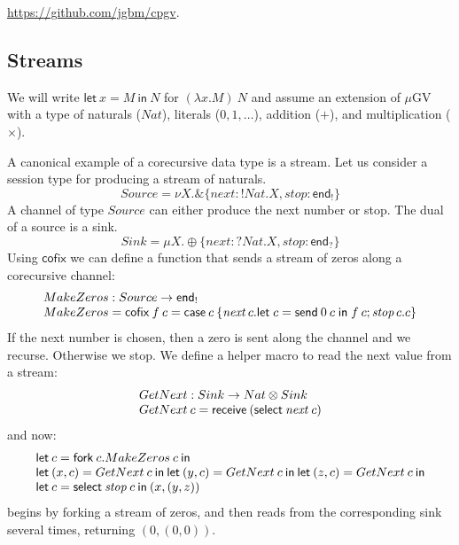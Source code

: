 \documentclass[orivec,envcountsame]{llncs}
\makeatletter
\newcommand{\with}{\mathbin\binampersand}
\newcommand{\gvout}[2]{{!#1.#2}}
\newcommand{\gvin}[2]{{?#1.#2}}
\newcommand{\lto}{\ensuremath{\multimap}}
\newcommand{\uto}{\ensuremath{\rightarrow}}
\newcommand{\outterm}{\mkwd{end}_!}
\newcommand{\interm}{\mkwd{end}_?}
\newcommand{\mkwd}[1]{\mathsf{#1}}
\newcommand{\clabel}[1]{\mathit{#1}}
\newcommand{\gvsend}[2]{\mkwd{send}\:#1\:#2}
\newcommand{\gvreceive}[1]{\mkwd{receive}\:#1}
\newcommand{\gvlet}[3]{\mkwd{let}\;#1 = #2\;\mkwd{in}\;#3}
\newcommand{\gvselect}[2]{\mkwd{select}\:#1\:#2}
\newcommand{\gvcase}[2]{\mkwd{case}\:#1\:\{#2\}}
\newcommand{\gvfork}[2]{\mkwd{fork}\:#1.#2}
\newcommand{\lrkwd}{\mkwd{cofix}}
\newcommand{\gvifthen}[3]{\mkwd{if}\:#1\:\mkwd{then}\:#2\:\mkwd{else}\:#3}
\newcommand{\key}{\mkwd}
\newcommand{\cofix}{\lrkwd}
\newcommand{\mucp}{$\mu\mathrm{CP}$\xspace}
\newcommand{\mugv}{$\mu\mathrm{GV}$\xspace}
\newcommand{\ba}{\begin{array}}
\newcommand{\ea}{\end{array}}
\newcommand{\bl}{\ba[t]{@{}l@{}}}
\newcommand{\el}{\ea}
\newcommand{\secref}[1]{Section~\ref{sec:#1}}
\makeatother
\begin{document}
\begin{center}
\url{https://github.com/jgbm/cpgv}.
\end{center}

%

\subsection{Streams}

We will write $\key{let}\:x=M\:\key{in}\:N$ for $(\lambda x.M)\:N$ and assume an extension of \mugv
with a type of naturals ($Nat$), literals ($0,1,\dots$), addition ($+$), and multiplication
($\times$).

A canonical example of a corecursive data type is a stream. Let us consider a session type for
producing a stream of naturals.
%
\small
\[
Source = \nu X.\with \{\clabel{next}: \gvout{Nat}{X}, \clabel{stop}: \outterm \}
\]
\normalsize
%
A channel of type $Source$ can either produce the next number or stop. The dual of a source is a
sink.
\small
\[
Sink = \mu X.\oplus \{\clabel{next}: \gvin{Nat}{X}, \clabel{stop}: \interm \}
\]
\normalsize
%
Using $\cofix$ we can define a function that sends a stream of zeros along a corecursive channel:
\small
\[
  \bl
  MakeZeros : Source \uto \outterm \\
  MakeZeros = \cofix\:f\:c = \gvcase{c}{\clabel{next}\,c.\gvlet{c}{\gvsend{0}{c}}{f\:c};
                                        \clabel{stop}\,c.c}
  \el
\]
\normalsize
If the next number is chosen, then a zero is sent along the channel and we recurse. Otherwise we
stop.
%
%
We define a helper macro to read the next value from a stream:
\small\[
\bl
GetNext : Sink \uto Nat \otimes Sink \\
GetNext\:c = \gvreceive{(\gvselect{\clabel{next}}{c})} \\
\el
\]\normalsize
and now:
\small\[
\bl
\key{let}\:c = \gvfork{c}{MakeZeros\:c}\:\key{in} \\
\key{let}\:(x, c) = GetNext\:c\:\key{in}\:
\key{let}\:(y, c) = GetNext\:c\:\key{in}\:
\key{let}\:(z, c) = GetNext\:c\:\key{in} \\
\key{let}\:c = \gvselect{\clabel{stop}}{c}\:\key{in}\:(x, (y, z)) \\
\el
\]\normalsize
begins by forking a stream of zeros, and then reads from the corresponding sink several times,
returning $(0, (0, 0))$.
\end{document}
